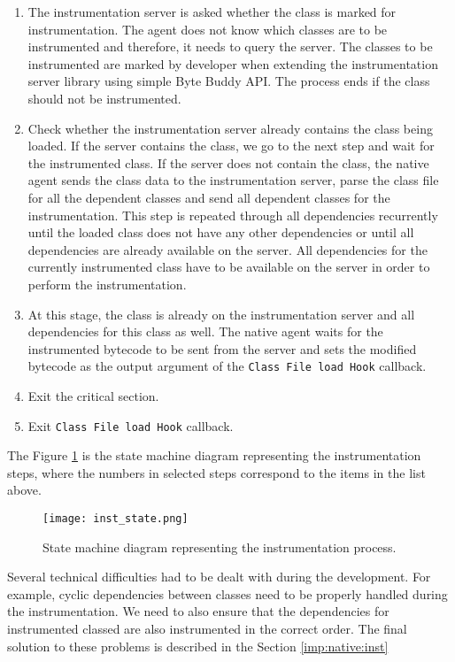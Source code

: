 \begin{enumerate}
	\item The instrumentation server is asked whether the class is marked for instrumentation. The agent does not know which classes are to be instrumented and therefore, it needs to query the server. The classes to be instrumented are marked by developer when extending the instrumentation server library using simple Byte Buddy API. The process ends if the class should not be instrumented.
	
	\item Check whether the instrumentation server already contains the class being loaded. If the server contains the class, we go to the next step and wait for the instrumented class. If the server does not contain the class, the native agent sends the class data to the instrumentation server, parse the class file for all the dependent classes and send all dependent classes for the instrumentation. This step is repeated through all dependencies recurrently until the loaded class does not have any other dependencies or until all dependencies are already available on the server. All dependencies for the currently instrumented class have to be available on the server in order to perform the instrumentation.

	\item At this stage, the class is already on the instrumentation server and all dependencies for this class as well. The native agent waits for the instrumented bytecode to be sent from the server and sets the modified bytecode as the output argument of the \texttt{Class File load Hook} callback.
	
	\item Exit the critical section.
	\item Exit \texttt{Class File load Hook} callback.
\end{enumerate}
The Figure \ref{fig:inst_state} is the state machine diagram representing the instrumentation steps, where the numbers in selected steps correspond to the items in the list above.
	\begin{figure}
		\centering
		\texttt{[image: inst\_state.png]}
		\caption{State machine diagram representing the instrumentation process.}
		\label{fig:inst_state}
	\end{figure}
	
Several technical difficulties had to be dealt with during the development. For example, cyclic dependencies between classes need to be properly handled during the instrumentation. We need to also ensure that the dependencies for instrumented classed are also instrumented in the correct order. The final solution to these problems is described in the Section \ref{imp:native:inst}

